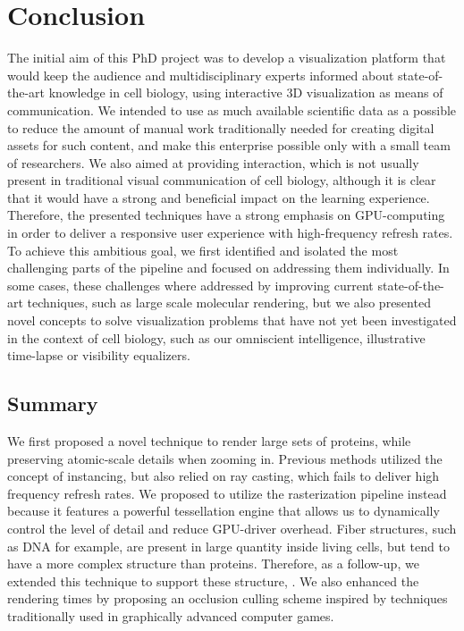 \chapter{Conclusion}
\label{sec:section5}

The initial aim of this PhD project was to develop a visualization platform that would keep the audience and multidisciplinary experts informed about state-of-the-art knowledge in cell biology, using interactive 3D visualization as means of communication.
We intended to use as much available scientific data as a possible to reduce the amount of manual work traditionally needed for creating digital assets for such content, and make this enterprise possible only with a small team of researchers.
We also aimed at providing interaction, which is not usually present in traditional visual communication of cell biology, although it is clear that it would have a strong and beneficial impact on the learning experience.
Therefore, the presented techniques have a strong emphasis on GPU-computing in order to deliver a responsive user experience with high-frequency refresh rates. 
To achieve this ambitious goal, we first identified and isolated the most challenging parts of the pipeline and focused on addressing them individually.
In some cases, these challenges where addressed by improving current state-of-the-art techniques, such as large scale molecular rendering, but we also presented novel concepts to solve visualization problems that have not yet been investigated in the context of cell biology, such as our omniscient intelligence, illustrative time-lapse or visibility equalizers.  

\section{Summary}

We first proposed a novel technique to render large sets of proteins, while preserving atomic-scale details when zooming in.
Previous methods utilized the concept of instancing, but also relied on ray casting, which fails to deliver high frequency refresh rates. 
We proposed to utilize the rasterization pipeline instead because it features a powerful tessellation engine that allows us to dynamically control the level of detail and reduce GPU-driver overhead. 
Fiber structures, such as DNA for example, are present in large quantity inside living cells, but tend to have a more complex structure than proteins. 
Therefore, as a follow-up, we extended this technique to support these structure, .
We also enhanced the rendering times by proposing an occlusion culling scheme inspired by techniques traditionally used in graphically advanced computer games. 

